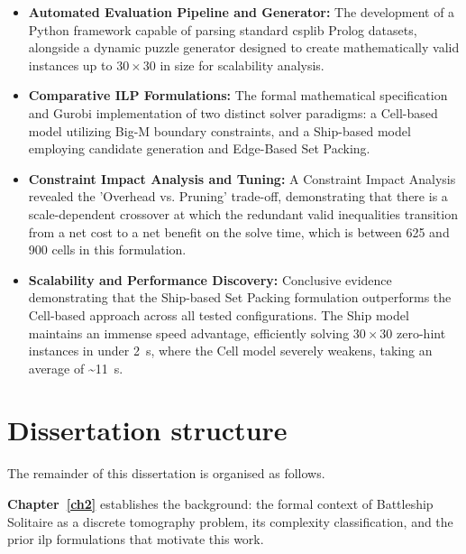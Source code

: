 \begin{itemize}
  \item \textbf{Automated Evaluation Pipeline and Generator:} The development of a Python framework capable of parsing standard \gls{csplib} Prolog datasets, alongside a dynamic puzzle generator designed to create mathematically valid instances up to $30 \times 30$ in size for scalability analysis.
  \item \textbf{Comparative ILP Formulations:} The formal mathematical specification and Gurobi implementation of two distinct solver paradigms: a Cell-based model utilizing Big-M boundary constraints, and a Ship-based model employing candidate generation and Edge-Based Set Packing.
  \item \textbf{Constraint Impact Analysis and Tuning:} A Constraint Impact Analysis revealed the 'Overhead vs. Pruning' trade-off, demonstrating that there is a scale-dependent crossover at which the redundant valid inequalities transition from a net cost to a net benefit on the solve time, which is between 625 and 900 cells in this formulation.
  \item \textbf{Scalability and Performance Discovery:} Conclusive evidence demonstrating that the Ship-based Set Packing formulation outperforms the Cell-based approach across all tested configurations. The Ship model maintains an immense speed advantage, efficiently solving $30 \times 30$ zero-hint instances in under \SI{2}{\second}, where the Cell model severely weakens, taking an average of \textasciitilde\SI{11}{\second}.
\end{itemize}


\section{Dissertation structure}\label{sec:roadmap}


The remainder of this dissertation is organised as follows.

\textbf{Chapter~\ref{ch2}} establishes the background: the formal context of Battleship Solitaire as a discrete tomography problem, its complexity classification, and the prior \gls{ilp} formulations that motivate this work.

